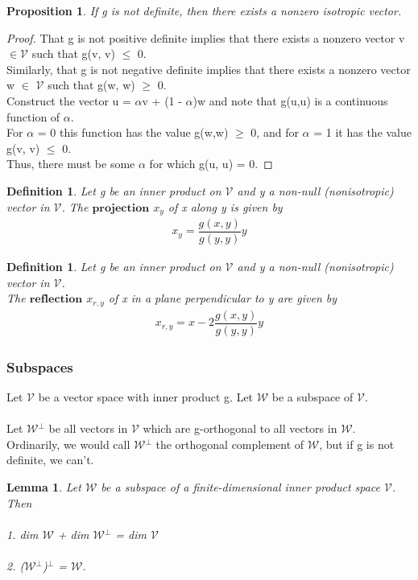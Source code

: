 \documentclass[12pt,a4paper]{article}
\newtheorem{lem}[thm]{Lemma}
\newtheorem{defn}[thm]{Definition}
\newtheorem{prop}{Proposition}
\begin{document}
\begin{prop}
If g is not definite, then there exists a nonzero
isotropic vector.
\end{prop}
\begin{proof}
That g is not positive definite implies that there exists a nonzero vector v$\in$$\mathcal{V}$ such that g(v, v) $\leq$ 0. \\Similarly, that g is not negative definite
implies that there exists a nonzero vector w $\in$ $\mathcal{V}$ such that g(w, w) $\geq$ 0. \\Construct the vector u = $\alpha$v + (1 - $\alpha$)w and note that g(u,u) is a continuous function of $\alpha$. \\For $\alpha$ = 0 this function has the value g(w,w) $\geq$ 0, and for $\alpha$ = 1 it has the value g(v, v) $\leq$ 0. \\Thus, there must be some $\alpha$ for which g(u, u) = 0.
\end{proof}
\begin{defn}
Let g be an inner product on $\mathcal{V}$ and y a non-null (nonisotropic) vector in $\mathcal{V}$. The $\textbf{projection}$ $x_y$ of x along y is given by 
\begin{align*}
x_y = \dfrac{g(x,y)}{g(y,y)} y
\end{align*}
\end{defn}
\begin{defn}
Let g be an inner product on $\mathcal{V}$ and y a non-null (nonisotropic) vector in $\mathcal{V}$. \\The $\textbf{reflection}$ $x_{r,y}$ of x in a plane perpendicular to y are given by 
\begin{align*}
x_{r,y} = x - 2 \dfrac{g(x,y)}{g(y,y)} y
\end{align*}
\end{defn}

\subsubsection{Subspaces}
Let $\mathcal{V}$ be a vector space with inner product g. Let $\mathcal{W}$ be a subspace of $\mathcal{V}$.\\\\
Let $\mathcal{W}$$^\perp$ be all vectors in $\mathcal{V}$ which are g-orthogonal to all vectors in $\mathcal{W}$.\\
Ordinarily, we would call $\mathcal{W}$$^\perp$ the orthogonal complement of $\mathcal{W}$, but if g
is not definite, we can’t.
\begin{lem}
Let $\mathcal{W}$ be a subspace of a finite-dimensional inner product
space $\mathcal{V}$. Then\\\\
1. dim $\mathcal{W}$ + dim $\mathcal{W}$$^\perp$ = dim $\mathcal{V}$\\\\
2. ($\mathcal{W}$$^\perp$)$^\perp$ = $\mathcal{W}$.
\end{lem}
\end{document}
